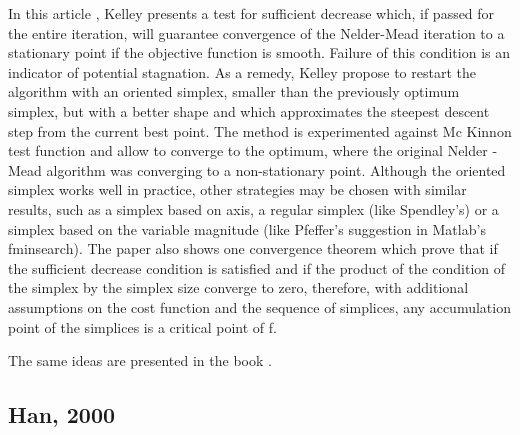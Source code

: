 In this article \cite{589283}, Kelley presents a test for sufficient decrease which, 
if passed for the entire iteration, will guarantee convergence of the 
Nelder-Mead iteration to a stationary point if the objective function is 
smooth. Failure of this condition is an indicator of potential 
stagnation. As a remedy, Kelley propose to restart the algorithm with an 
oriented simplex, smaller than the previously optimum simplex, but with 
a better shape and which approximates the steepest descent step from the 
current best point. The method is experimented against Mc Kinnon test 
function and allow to converge to the optimum, where the original Nelder
-Mead algorithm was converging to a non-stationary point. Although the 
oriented simplex works well in practice, other strategies may be chosen 
with similar results, such as a simplex based on axis, a regular simplex 
(like Spendley's) or a simplex based on the variable magnitude (like 
Pfeffer's suggestion in Matlab's fminsearch). The paper also shows one 
convergence theorem which prove that if the sufficient decrease 
condition is satisfied and if the product of the condition of the simplex 
by the simplex size converge to zero, therefore, with additional 
assumptions on the cost function and the sequence of simplices, any 
accumulation point of the simplices is a critical point of f.

The same ideas are presented in the book \cite{Kelley1999}.

\subsection{Han, 2000}

